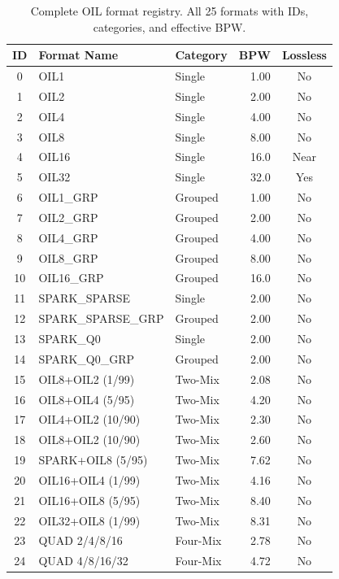 \begin{table}[htbp]
\centering
\caption{Complete OIL format registry. All 25 formats with IDs,
categories, and effective BPW.}
\label{tab:format_registry}
\small
\begin{tabular}{cllrc}
\toprule
\textbf{ID} & \textbf{Format Name} & \textbf{Category} &
\textbf{BPW} & \textbf{Lossless} \\
\midrule
0  & OIL1               & Single   & 1.00 & No \\
1  & OIL2               & Single   & 2.00 & No \\
2  & OIL4               & Single   & 4.00 & No \\
3  & OIL8               & Single   & 8.00 & No \\
4  & OIL16              & Single   & 16.0 & Near \\
5  & OIL32              & Single   & 32.0 & Yes \\
6  & OIL1\_GRP          & Grouped  & 1.00 & No \\
7  & OIL2\_GRP          & Grouped  & 2.00 & No \\
8  & OIL4\_GRP          & Grouped  & 4.00 & No \\
9  & OIL8\_GRP          & Grouped  & 8.00 & No \\
10 & OIL16\_GRP         & Grouped  & 16.0 & No \\
11 & SPARK\_SPARSE      & Single   & 2.00 & No \\
12 & SPARK\_SPARSE\_GRP & Grouped  & 2.00 & No \\
13 & SPARK\_Q0          & Single   & 2.00 & No \\
14 & SPARK\_Q0\_GRP     & Grouped  & 2.00 & No \\
15 & OIL8+OIL2 (1/99)   & Two-Mix  & 2.08 & No \\
16 & OIL8+OIL4 (5/95)   & Two-Mix  & 4.20 & No \\
17 & OIL4+OIL2 (10/90)  & Two-Mix  & 2.30 & No \\
18 & OIL8+OIL2 (10/90)  & Two-Mix  & 2.60 & No \\
19 & SPARK+OIL8 (5/95)  & Two-Mix  & 7.62 & No \\
20 & OIL16+OIL4 (1/99)  & Two-Mix  & 4.16 & No \\
21 & OIL16+OIL8 (5/95)  & Two-Mix  & 8.40 & No \\
22 & OIL32+OIL8 (1/99)  & Two-Mix  & 8.31 & No \\
23 & QUAD 2/4/8/16      & Four-Mix & 2.78 & No \\
24 & QUAD 4/8/16/32     & Four-Mix & 4.72 & No \\
\bottomrule
\end{tabular}
\end{table}

